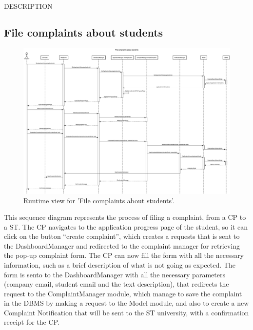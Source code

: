DESCRIPTION


\subsection{File complaints about students}
\begin{figure}[H]
    \begin{center}
        \includegraphics[width=0.8\linewidth]{DD/LaTeX/Images/RuntimeView/FileComplaintsAboutStudents.png}
        \caption{Runtime view for 'File complaints about students'.}
        \label{fig:runtime_FileComplaintsAboutStudents}%
    \end{center}
\end{figure}

This sequence diagram represents the process of filing a complaint, from a CP to a ST. The CP navigates to the application progress page of the student, so it can click on the button “create complaint”, which creates a requests that is sent to the DashboardManager and redirected to the complaint manager for retrieving the pop-up complaint form. The CP can now fill the form with all the necessary information, such as a brief description of what is not going as expected. The form is sento to the DashboardManager with all the necessary parameters (company email, student email and the text description), that redirects the request to the ComplaintManager module, which manage to save the complaint in the DBMS by making a request to the Model module, and also to create a new Complaint Notification that will be sent to the ST university, with a confirmation receipt for the CP.



